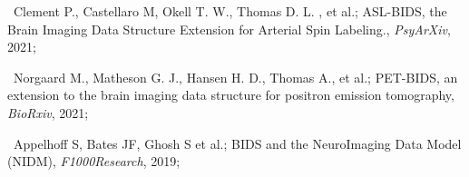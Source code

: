 \textbullet~Clement P., Castellaro M, Okell T. W., Thomas D. L. , et al.;
ASL-BIDS, the Brain Imaging Data Structure Extension for Arterial Spin Labeling.,
\textit{PsyArXiv},
2021; 

\textbullet~Norgaard M., Matheson G. J., Hansen H. D., Thomas A., et al.;
PET-BIDS, an extension to the brain imaging data structure for positron emission tomography,
\textit{BioRxiv},
2021; 


\textbullet~Appelhoff S, Bates JF, Ghosh S et al.;
BIDS and the NeuroImaging Data Model (NIDM), 
\textit{F1000Research},
2019;



